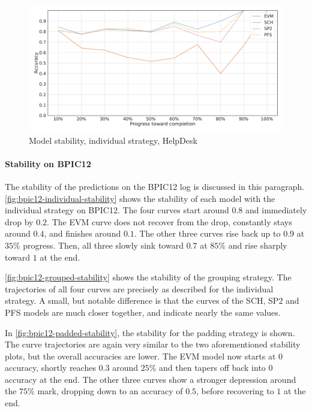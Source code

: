 \begin{figure}[!htb]
    \centering
    \includegraphics[width=\textwidth]{gfx/helpdesk/individual_stability.pdf}
    \caption{Model stability, individual strategy, HelpDesk}
    \label{fig:helpdesk-individual-stability}
\end{figure}

\paragraph{Stability on BPIC12}
The stability of the predictions on the BPIC12 log is discussed in this paragraph.
\autoref{fig:bpic12-individual-stability} shows the stability of each model with the individual strategy on BPIC12.
The four curves start around $0.8$ and immediately drop by $0.2$.
The EVM curve does not recover from the drop, constantly stays around $0.4$, and finishes around $0.1$.
The other three curves rise back up to $0.9$ at $35\%$ progress.
Then, all three slowly sink toward $0.7$ at $85\%$ and rise sharply toward $1$ at the end.

\autoref{fig:bpic12-grouped-stability} shows the stability of the grouping strategy.
The trajectories of all four curves are precisely as described for the individual strategy.
A small, but notable difference is that the curves of the SCH, SP2 and PFS models are much closer together, and indicate nearly the same values.

In \autoref{fig:bpic12-padded-stability}, the stability for the padding strategy is shown.
The curve trajectories are again very similar to the two aforementioned stability plots, but the overall accuracies are lower.
The EVM model now starts at $0$ accuracy, shortly reaches $0.3$ around $25\%$ and then tapers off back into $0$ accuracy at the end.
The other three curves show a stronger depression around the $75\%$ mark, dropping down to an accuracy of $0.5$, before recovering to $1$ at the end.


